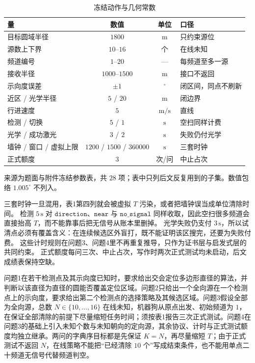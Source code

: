 \begin{table}[H]
\centering
\caption{冻结动作与几何常数}
\label{tab:params}
\begin{tabular}{lccl}
\hline
量 & 数值 & 单位 & 口径 \\
\hline
目标圆域半径 & $1800$ & $\mathrm{m}$ & 只约束源位 \\
源数上下界 & $10$--$16$ & 个 & 在线未知 \\
频道编号 & $1$--$20$ & --- & 每频道至多一源 \\
接收半径 & $1000$--$1500$ & $\mathrm{m}$ & 接口不返回 \\
示向度误差 & $\pm 1$ & $^\circ$ & 闭区间，同点不刷新 \\
近区 / 光学半径 & $5$ / $20$ & $\mathrm{m}$ & 闭边界 \\
行进速度 & $5$ & $\mathrm{m/s}$ & 直线 \\
检测 / 切换 & $5$ / $1$ & $\mathrm{s}$ & 空扫同样计费 \\
光学 / 成功激光 & $3$ / $2$ & $\mathrm{s}$ & 失败仍付光学 \\
墙钟 / 窗口 / 虚拟上限 & $1200$ / $1500$ / $360000$ & $\mathrm{s}$ & 三套时钟 \\
正式额度 & $3$ & 次/问 & 中止占次 \\
\hline
\end{tabular}

\vspace{0.4em}
{\small 来源为题面与附件冻结参数表，共 $28$ 项；表中只列后文反复用到的子集。数值包络 $1.005^\circ$ 不列入。}
\end{table}

三套时钟一旦混用，表1第四列就会被虚拟 $T$ 污染，或者把墙钟误当成单位清除时间。
检测 $5\,\mathrm{s}$ 对 $\mathtt{direction}$、$\mathtt{near}$ 与 $\mathtt{no\_signal}$ 同样收取，因此空扫很多频道会直接抬高 $T$，而不能靠事后把无信号从账本里删掉。
光学失败仍支付 $3\,\mathrm{s}$，所以试清点必须有覆盖含义：在连续候选区外盲打，既不能证明该区搜完，还要为失败付费。
这些计时规则在问题3、问题4里不再重复推导，只作为证书层与启发式层的共同约束。
正式额度每问三次、中止占次，写作时两次正式测试均未启动，后文成绩表保持空缺。

问题1在若干检测点及其示向度已知时，要求给出交会定位多边形直径的算法，并判断以该直径为直径的圆能否覆盖定位区域。问题2只给出一个全向源在一个检测点上的示向度，要求给出第二个检测点的选择策略及其候选区域。问题3假设全部为全向源，总数 $N\in\{10,\ldots,16\}$ 在线未知，机器狗从原点出发、初始频道为 $1$，在保证全部清除的前提下尽量缩短任务时间；须按表1报告三次正式测试。问题4在问题3的基础上引入未知个数与未知朝向的定向源，其余协议、计时与正式测试额度均独立继承。两问的字典序目标都是先保证 $K=N$，再尽量缩短 $T$；由于正式测试不返回 $N$，在线策略不能把“已经清除 $10$ 个”写成结束条件，也不能用单点二十频道无信号代替频道判空。

